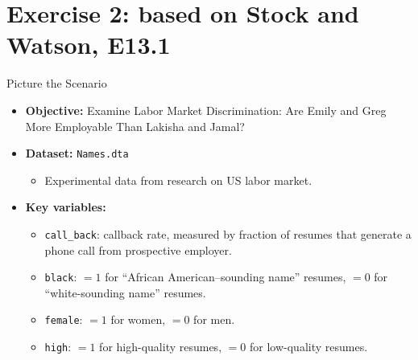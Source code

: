 \documentclass[
  10pt,
  ignorenonframetext,
]{beamer}
\providecommand{\tightlist}{%
  \setlength{\itemsep}{0pt}\setlength{\parskip}{0pt}}
\begin{document}
\hypertarget{exercise-2-based-on-stock-and-watson-e13.1}{%
\section{Exercise 2: based on Stock and Watson,
E13.1}\label{exercise-2-based-on-stock-and-watson-e13.1}}

\begin{frame}[fragile]{Picture the Scenario}
\protect\hypertarget{picture-the-scenario}{}
\begin{itemize}
\tightlist
\item
  \textbf{Objective:} Examine Labor Market Discrimination: Are Emily and
  Greg More Employable Than Lakisha and Jamal?
\end{itemize}

\vspace{0.8mm}

\begin{itemize}
\tightlist
\item
  \textbf{Dataset:} \texttt{Names.dta}

  \begin{itemize}
  \tightlist
  \item
    Experimental data from research on US labor market.
  \end{itemize}
\end{itemize}

\vspace{0.8mm}

\begin{itemize}
\tightlist
\item
  \textbf{Key variables:}

  \begin{itemize}
  \tightlist
  \item
    \texttt{call\_back}: callback rate, measured by fraction of resumes
    that generate a phone call from prospective employer.
  \item
    \texttt{black}: \(= 1\) for ``African American--sounding name''
    resumes, \(= 0\) for ``white-sounding name'' resumes.
  \item
    \texttt{female}: \(= 1\) for women, \(= 0\) for men.
  \item
    \texttt{high}: \(= 1\) for high-quality resumes, \(= 0\) for
    low-quality resumes.
  \end{itemize}
\end{itemize}
\end{frame}
\end{document}
